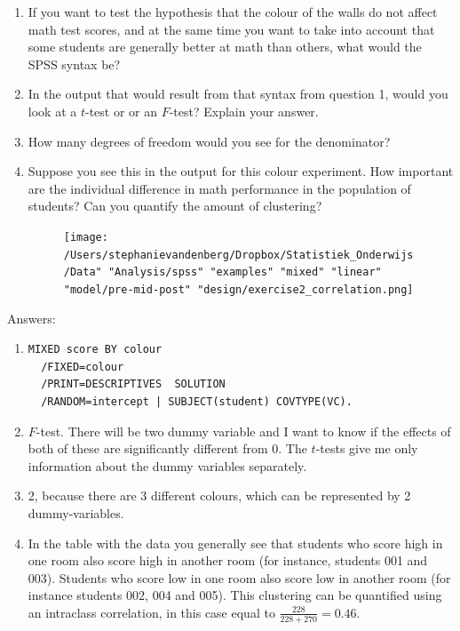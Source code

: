 \documentclass[]{report}\usepackage[]{graphicx}\usepackage[]{color}
\begin{document}
\begin{enumerate}
\item If you want to test the hypothesis that the colour of the walls do not affect math test scores, and at the same time you want to take into account that some students are generally better at math than others, what would the SPSS syntax be? 
\item In the output that would result from that syntax from question 1, would you look at a $t$-test or or an $F$-test? Explain your answer.
\item How many degrees of freedom would you see for the denominator?
\item Suppose you see this in the output for this colour experiment. How important are the individual difference in math performance in the population of students? Can you quantify the amount of clustering?



\begin{figure}[h]
    \begin{center}
       \texttt{[image: /Users/stephanievandenberg/Dropbox/Statistiek\_Onderwijs/Data" "Analysis/spss" "examples" "mixed" "linear" "model/pre-mid-post" "design/exercise2\_correlation.png]}
    \end{center}
\end{figure}

\end{enumerate}


Answers:
\begin{enumerate}
\item 

\begin{verbatim}
MIXED score BY colour
  /FIXED=colour
  /PRINT=DESCRIPTIVES  SOLUTION
  /RANDOM=intercept | SUBJECT(student) COVTYPE(VC).
\end{verbatim}

\item  $F$-test. There will be two dummy variable and I want to know if the effects of both of these are significantly different from 0. The $t$-tests  give me only information about the dummy variables separately. \\
\item  2, because there are 3 different colours, which can be represented by 2 dummy-variables. \\
\item  In the table with the data you generally see that students who score high in one room also score high in another room (for instance, students 001 and 003). Students who score low in one room also score low in another room (for instance students 002, 004 and 005). This clustering can be quantified using an intraclass correlation, in this case equal to $\frac{228}{228+270}=0.46$. 
\end{enumerate}
\end{document}
